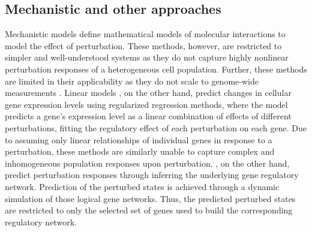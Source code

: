 \subsection{Mechanistic and other approaches}
Mechanistic models \citep{yuan2021cellbox, frohlich2018efficient} define mathematical models of molecular interactions to model the effect of perturbation.
These methods, however, are restricted to simpler and well-understood systems as they do not capture highly nonlinear perturbation responses of a heterogeneous cell population. Further, these methods are limited in their applicability as they do not scale to genome-wide measurements \citep{snijder2012single, berchtold2018systems, green2016systems}.
Linear models \citep{dixit2016perturb, kamimoto2020celloracle}, on the other hand,  predict changes in cellular gene expression levels using regularized regression methods, where the model predicts a gene's expression level as a linear combination of effects of different perturbations, fitting the regulatory effect of each perturbation on each gene.
Due to assuming only linear relationships of individual genes in response to a perturbation, these methods are similarly  unable to capture complex and inhomogeneous population responses upon perturbation.
\citet{heydari2022iqcell}, on the other hand, predict perturbation responses through inferring the underlying gene regulatory network. Prediction of the perturbed states is achieved through a dynamic simulation of those logical gene networks. Thus, the predicted perturbed states are restricted to only the selected set of genes used to build the corresponding regulatory network.


